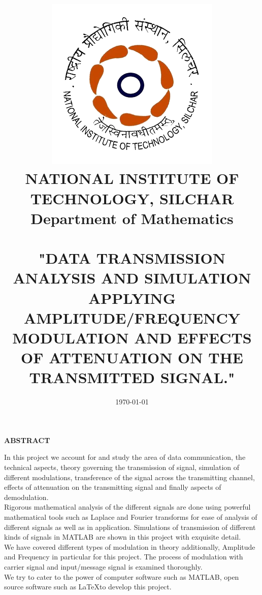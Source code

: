\documentclass[12pt,a4paper]{article}%
\begin{document}
	
	
	\begin{titlepage}
	\title{\includegraphics[width=0.38 \textwidth]{./NIT_Silchar_logo.png}\\\textbf{\large NATIONAL INSTITUTE OF TECHNOLOGY, SILCHAR}\\\textbf{{\large Department of Mathematics}}\\\\\bigskip\textbf{{\normalsize "DATA TRANSMISSION ANALYSIS AND SIMULATION APPLYING AMPLITUDE/FREQUENCY MODULATION AND EFFECTS OF ATTENUATION ON THE TRANSMITTED SIGNAL." }}}
	\date{\today}
	\clearpage\maketitle
	\thispagestyle{empty}
	\end{titlepage}
	
	\begin{center}
		\textbf{\large ABSTRACT}
	\end{center}
    \begin{flushleft}
    	\fontsize{12pt}{18pt}\selectfont
    	 In this project we account for and study the area of data communication, the technical aspects, theory governing the transmission of signal, simulation of different modulations, transference of the signal across the transmitting channel, effects of attenuation on the transmitting signal and finally aspects of demodulation.\\\bigskip
    	 Rigorous mathematical analysis of the different signals are done using powerful mathematical tools such as Laplace and Fourier transforms for ease of analysis of
    	 different signals as well as in application. Simulations of transmission of different kinds of signals in MATLAB are shown in this project with exquisite detail.\\\bigskip
    	 We have covered different types of modulation in theory additionally, Amplitude and Frequency in particular for this project. The process of modulation with carrier signal
    	 and input/message signal is examined thoroughly.\\\bigskip
    	 We try to cater to the power of computer software such as MATLAB, open source software such as \LaTeX to develop this project.
	\end{flushleft}
	
\end{document}

